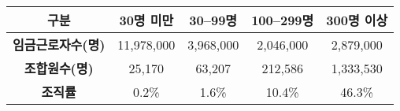 \begin{tabular}{c|c|c|c|c}
\toprule
\textbf{구분} & \textbf{30명 미만} & \textbf{30--99명} & \textbf{100--299명} & \textbf{300명 이상} \\ \midrule
\textbf{임금근로자수(명)} & 11,978,000 & 3,968,000 & 2,046,000 & 2,879,000 \\ \hline
\textbf{조합원수(명)} & 25,170 & 63,207 & 212,586 & 1,333,530 \\ \hline
\textbf{조직률} & 0.2\% & 1.6\% & 10.4\% & 46.3\% \\ \bottomrule
\end{tabular}
